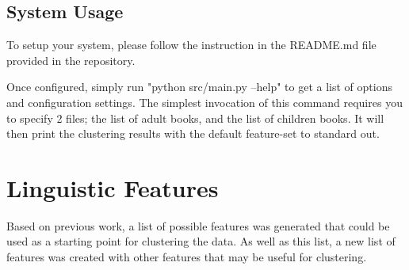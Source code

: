 \documentclass[]{article}
\begin{document}
\subsection{System Usage}

To setup your system, please follow the instruction in the README.md file provided in the repository.

Once configured, simply run "python src/main.py --help" to get a list of options and configuration settings.
The simplest invocation of this command requires you to specify 2 files; the list of adult books, and the list of children books.
It will then print the clustering results with the default feature-set to standard out.

\section{Linguistic Features}

Based on previous work, a list of possible features was generated that could be used as a starting point for clustering the data.
As well as this list, a new list of features was created with other features that may be useful for clustering.
\end{document}
